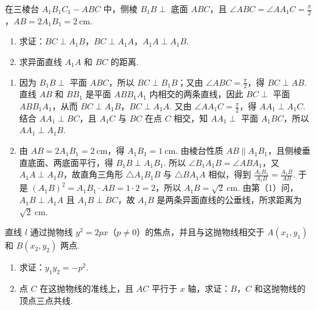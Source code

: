 \begin{problem}
在三棱台 \(A_{1}B_{1}C_{1}-ABC\) 中，侧棱 \(B_{1}B\perp\) 底面 \(ABC\)，且 \(\angle ABC=\angle AA_{1}C=\frac\pi2\)，\(AB=2A_{1}B_{1}=2\mathrm{~cm}\).
\begin{enumerate}
\item 求证：\(BC\perp A_{1}B\)，\(BC\perp A_{1}A\)，\(A_{1}A\perp A_{1}B\).
\item 求异面直线 \(A_{1}A\) 和 \(BC\) 的距离.
\end{enumerate}
\end{problem}

\begin{solution}
\begin{enumerate}
\item
因为 \(B_{1}B\perp\) 平面 \(ABC\)，所以 \(BC\perp B_{1}B\)；又由 \(\angle ABC=\frac\pi2\)，得 \(BC\perp AB\). 直线 \(AB\) 和 \(BB_{1}\) 是平面 \(ABB_{1}A_{1}\) 内相交的两条直线，因此 \(BC\perp\) 平面 \(ABB_{1}A_{1}\)，从而 \(BC\perp A_{1}B\)，\(BC\perp A_{1}A\).
又由 \(\angle AA_{1}C=\frac\pi2\)，得 \(AA_{1}\perp A_{1}C\). 结合 \(AA_{1}\perp BC\)，且 \(A_{1}C\) 与 \(BC\) 在点 \(C\) 相交，知 \(AA_{1}\perp\) 平面 \(A_{1}BC\)，所以 \(AA_{1}\perp A_{1}B\).
\item
由 \(AB=2A_{1}B_{1}=2\mathrm{~cm}\)，得 \(A_{1}B_{1}=1\mathrm{~cm}\). 由棱台性质 \(AB\parallel A_{1}B_{1}\)，且侧棱垂直底面、两底面平行，得 \(B_{1}B\perp A_{1}B_{1}\). 所以 \(\angle B_{1}A_{1}B=\angle ABA_{1}\)，又 \(A_{1}A\perp A_{1}B\)，故直角三角形 \(\triangle A_{1}B_{1}B\) 与 \(\triangle BA_{1}A\) 相似，得到 \(\frac{A_{1}B_{1}}{A_{1}B}=\frac{A_{1}B}{AB}\). 于是 \((A_{1}B)^{2}=A_{1}B_{1}\cdot AB=1\cdot2=2\)，所以 \(A_{1}B=\sqrt2\mathrm{~cm}\).
由第（1）问，\(A_{1}B\perp A_{1}A\) 且 \(A_{1}B\perp BC\)，故 \(A_{1}B\) 是两条异面直线的公垂线，所求距离为 \(\sqrt2\mathrm{~cm}\).
\end{enumerate}
\end{solution}

\begin{problem}
直线 \(l\) 通过抛物线 \(y^{2}=2px\)（\(p\neq0\)）的焦点，并且与这抛物线相交于 \(A(x_{1},y_{1})\) 和 \(B(x_{2},y_{2})\) 两点.
\begin{enumerate}
\item 求证：\(y_{1}y_{2}=-p^{2}\).
\item 点 \(C\) 在这抛物线的准线上，且 \(AC\) 平行于 \(x\) 轴，求证：\(B\)，\(C\) 和这抛物线的顶点三点共线.
\end{enumerate}
\end{problem}

